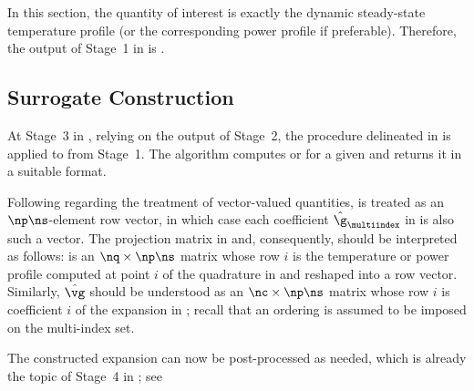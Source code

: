 In this section, the quantity of interest \g is exactly the dynamic steady-state
temperature profile \mq (or the corresponding power profile \mp if preferable).
Therefore, the output of Stage~1 in  is
.

\subsection{Surrogate Construction}

At Stage~3 in , relying on the output of Stage~2, the
procedure delineated in  is applied to
 from Stage~1. The algorithm computes
\mp or \mq for a given \vu and returns it in a suitable format.

Following  regarding the treatment of
vector-valued quantities, \g is treated as an $\np \ns$-element row vector, in
which case each coefficient $\hat{\g}_{\multiindex}$ in 
is also such a vector. The projection matrix in 
and, consequently,  should be interpreted as follows: \vg
is an $\nq \times \np \ns$ matrix whose row $i$ is the temperature or power
profile computed at point $i$ of the quadrature in  and
reshaped into a row vector. Similarly, $\hat{\vg}$ should be understood as an
$\nc \times \np \ns$ matrix whose row $i$ is coefficient $i$ of the expansion in
; recall that an ordering is assumed to be imposed on the
multi-index set.

The constructed expansion can now be post-processed as needed, which is already
the topic of Stage~4 in ; see 
